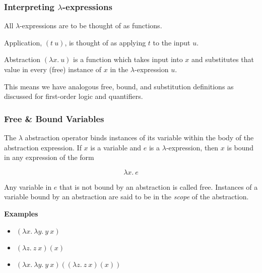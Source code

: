 \documentclass{beamer}
\begin{document}
\begin{frame}
	\frametitle{Interpreting $\lambda$-expressions}

	All $\lambda$-expressions are to be thought of as functions.

	Application, $(t \ u)$, is thought of as applying $t$ to the input $u$.

	Abstraction $(\lambda x. \ u)$ is a function which takes input into $x$ and substitutes that value in every (free) instance of $x$ in the $\lambda$-expression $u$.

	This means we have analogous free, bound, and substitution definitions as discussed for first-order logic and quantifiers. 

	\vspace{30mm}

\end{frame}

\begin{frame}
	\frametitle{Free \& Bound Variables}

	The $\lambda$ abstraction operator binds instances of its variable within the body of the abstraction expression. If $x$ is a variable and $e$ is a $\lambda$-expression, then $x$ is bound in any expression of the form 
	
	$$\lambda x. \ e$$

	Any variable in $e$ that is not bound by an abstraction is called free. Instances of a variable bound by an abstraction are said to be in the \emph{scope} of the abstraction. 
	
	{\bf Examples}

	\begin{itemize}

		\item[] $(\lambda x. \ \lambda y. \ y \ x)$ \vspace{0.2cm}

		\item[] $(\lambda z. \ z \ x)(x) $ \vspace{0.2cm}

		\item[] $(\lambda x. \ \lambda y. \ y \ x)((\lambda z. \ z \ x)(x))$
	
	\end{itemize}
	
\end{frame}
\end{document}
